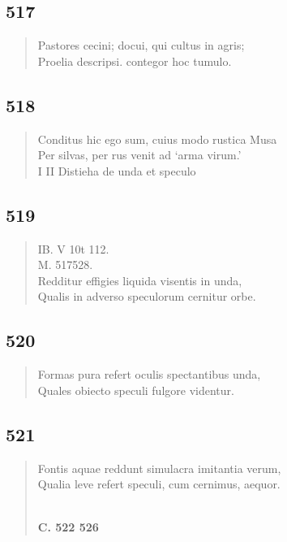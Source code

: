 \documentclass[11pt, a4paper]{report}
\begin{document}
            \subsection*{517}
      \begin{verse}
      Pastores cecini; docui, qui cultus in agris; \\ Proelia descripsi. contegor hoc tumulo. \\ 
      \end{verse}
  
            \subsection*{518}
      \begin{verse}
      Conditus hic ego sum, cuius modo rustica Musa \\ Per silvas, per rus venit ad ‘arma virum.’ \\ I II Distieha de unda et speculo \\ 
      \end{verse}
  
            \subsection*{519}
      \begin{verse}
      IB. V 10t 112. \\ M. 517528. \\ Redditur effigies liquida visentis in unda, \\ Qualis in adverso speculorum cernitur orbe. \\ 
      \end{verse}
  
            \subsection*{520}
      \begin{verse}
      Formas pura refert oculis spectantibus unda, \\ Quales obiecto speculi fulgore videntur. \\ 
      \end{verse}
  
            \subsection*{521}
      \begin{verse}
      Fontis aquae reddunt simulacra imitantia verum, \\ Qualia leve refert speculi, cum cernimus, aequor. \\ 
        ﻿\pagebreak 
    \begin{center} \textbf{C. 522 526} \end{center} \marginpar{[65]} 
      \end{verse}
  
\end{document}
